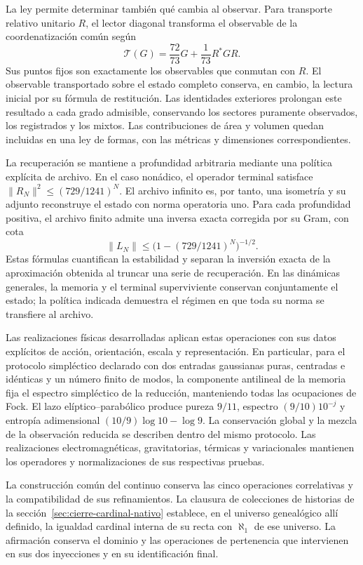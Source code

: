 La ley permite determinar también qué cambia al observar. Para transporte relativo unitario \(R\), el lector diagonal transforma el observable de la coordenatización común según
\[
 \mathcal T(G)=\frac{72}{73}G+\frac1{73}R^*GR.
\]
Sus puntos fijos son exactamente los observables que conmutan con \(R\). El observable transportado sobre el estado completo conserva, en cambio, la lectura inicial por su fórmula de restitución. Las identidades exteriores prolongan este resultado a cada grado admisible, conservando los sectores puramente observados, los registrados y los mixtos. Las contribuciones de área y volumen quedan incluidas en una ley de formas, con las métricas y dimensiones correspondientes.

La recuperación se mantiene a profundidad arbitraria mediante una política explícita de archivo. En el caso nonádico, el operador terminal satisface \(\|R_N\|^2\leq(729/1241)^N\). El archivo infinito es, por tanto, una isometría y su adjunto reconstruye el estado con norma operatoria uno. Para cada profundidad positiva, el archivo finito admite una inversa exacta corregida por su Gram, con cota
\[
 \|L_N\|\leq\bigl(1-(729/1241)^N\bigr)^{-1/2}.
\]
Estas fórmulas cuantifican la estabilidad y separan la inversión exacta de la aproximación obtenida al truncar una serie de recuperación. En las dinámicas generales, la memoria y el terminal superviviente conservan conjuntamente el estado; la política indicada demuestra el régimen en que toda su norma se transfiere al archivo.

Las realizaciones físicas desarrolladas aplican estas operaciones con sus datos explícitos de acción, orientación, escala y representación. En particular, para el protocolo simpléctico declarado con dos entradas gaussianas puras, centradas e idénticas y un número finito de modos, la componente antilineal de la memoria fija el espectro simpléctico de la reducción, manteniendo todas las ocupaciones de Fock. El lazo elíptico--parabólico produce pureza \(9/11\), espectro \((9/10)10^{-j}\) y entropía adimensional \((10/9)\log10-\log9\). La conservación global y la mezcla de la observación reducida se describen dentro del mismo protocolo. Las realizaciones electromagnéticas, gravitatorias, térmicas y variacionales mantienen los operadores y normalizaciones de sus respectivas pruebas.

La construcción común del continuo conserva las cinco operaciones correlativas y la compatibilidad de sus refinamientos. La clausura de colecciones de historias de la sección~\ref{sec:cierre-cardinal-nativo} establece, en el universo genealógico allí definido, la igualdad cardinal interna de su recta con \(\aleph_1\) de ese universo. La afirmación conserva el dominio y las operaciones de pertenencia que intervienen en sus dos inyecciones y en su identificación final.

